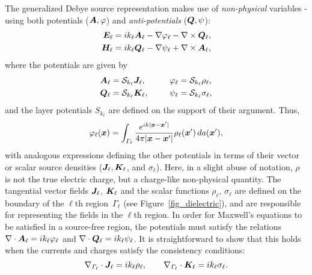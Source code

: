 \documentclass[11pt]{article}
\renewcommand{\phi}{\varphi}
\newcommand{\vct}{\vectorsym}
\newcommand{\surfdivl}{\nabla_{\Gamma_\ell} \cdot}
\newcommand{\bx}{\vct{ x}}
\newcommand{\bE}{\vectorsym{E}}
\newcommand{\bH}{\vct{ H}}
\newcommand{\bJ}{\vct{ J}}
\newcommand{\bK}{\vct{ K}}
\newcommand{\cS}{\mathcal S}
\newcommand\bQ{\vct{ Q}}
\newcommand\bA{\vct{A}}
\numberwithin{equation}{section}
\begin{document}
The generalized Debye source representation makes use of \emph{non-physical} 
variables - using both potentials ($\bA, \varphi$) and \emph{anti-potentials}
($\bQ, \psi$):
\begin{equation}\label{eq_gendebye}
  \begin{aligned}
    \bE_\ell &= ik_\ell \bA_\ell - \nabla \varphi_\ell - \nabla \times \bQ_\ell, \\
    \bH_\ell &= ik_\ell \bQ_\ell - \nabla \psi_\ell + \nabla \times \bA_\ell,
  \end{aligned}
\end{equation}
where the potentials are given by
\begin{equation}
  \begin{aligned}
    \bA_\ell &=  \mathcal S_{k_\ell} \bJ_\ell, \qquad& \varphi_\ell &=
    \cS_{k_\ell} \rho_\ell, \\
    \bQ_\ell &=  \mathcal S_{k_\ell} \bK_\ell , & \psi_\ell &=
    \cS_{k_\ell} \sigma_\ell,
  \end{aligned}
\end{equation}
and the layer potentials $S_{k_\ell}$ are defined on the support of their
argument. Thus,
\begin{equation}
  \varphi_\ell(\bx) = \int_{\Gamma_\ell} \frac{e^{ik|\bx-\bx'|}}
  {4\pi |\bx-\bx'|} \rho_\ell(\bx') \, da(\bx'),
\end{equation}
with analogous expressions defining the other potentials in terms of their
vector or scalar source densities ($\bJ_\ell, \bK_\ell$, and $\sigma_\ell$).
Here, in a slight abuse of notation, $\rho$ is 
not the true electric charge, but a charge-like 
non-physical quantity.
The tangential vector fields $\bJ_\ell$, $\bK_\ell$ and the scalar
functions $\rho_\ell$, $\sigma_\ell$ are defined on the boundary of
the $\ell$th region~$\Gamma_\ell$ (see Figure~\ref{fig_dielectric}),
and are responsible for representing the fields
in the $\ell$th region.
In order for Maxwell's equations to be satisfied in a
source-free region, the potentials must satisfy the relations
\mbox{$\nabla \cdot \bA_\ell = ik_\ell \phi_\ell$} and \mbox{$\nabla \cdot
\bQ_\ell = ik_\ell \psi_\ell$}. It is straightforward to show that this 
holds when the currents and charges satisfy the 
consistency conditions:
\begin{equation}
  \surfdivl \bJ_\ell
  = ik_\ell \rho_\ell, \qquad \surfdivl \bK_\ell = ik_\ell \sigma_\ell.
\label{consistcond}
\end{equation}
\end{document}
